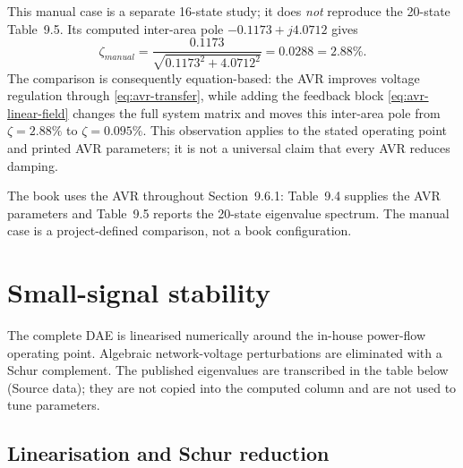 \documentclass[12pt,a4paper]{article}
\begin{document}
\begin{itemize}
  This manual case is a separate 16-state study; it does \emph{not} reproduce
  the 20-state Table~9.5. Its computed inter-area pole
  $-0.1173+j4.0712$ gives
  \begin{equation}
  \zeta_{manual}=\frac{0.1173}{\sqrt{0.1173^2+4.0712^2}}
  =0.0288=2.88\%.
  \end{equation}
  The comparison is consequently equation-based: the AVR improves voltage
  regulation through \eqref{eq:avr-transfer}, while adding the feedback block
  \eqref{eq:avr-linear-field} changes the full system matrix and moves this
  inter-area pole from $\zeta=2.88\%$ to $\zeta=0.095\%$. This observation
  applies to the stated operating point and printed AVR parameters; it is not
  a universal claim that every AVR reduces damping.
\end{itemize}
The book uses the AVR throughout Section~9.6.1: Table~9.4 supplies the AVR
parameters and Table~9.5 reports the 20-state eigenvalue spectrum. The manual
case is a project-defined comparison, not a book configuration.

\section{Small-signal stability}

The complete DAE is linearised numerically around the in-house power-flow
operating point. Algebraic network-voltage perturbations are eliminated with a
Schur complement. The published eigenvalues are transcribed in
the table below (Source data); they are not copied into the computed
column and are not used to tune parameters.

\subsection{Linearisation and Schur reduction}
\end{document}
